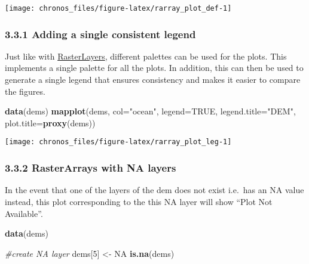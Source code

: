 \documentclass[]{article}
\newenvironment{Shaded}{\begin{snugshade}}{\end{snugshade}}
\newcommand{\KeywordTok}[1]{\textcolor[rgb]{0.13,0.29,0.53}{\textbf{#1}}}
\newcommand{\DataTypeTok}[1]{\textcolor[rgb]{0.13,0.29,0.53}{#1}}
\newcommand{\DecValTok}[1]{\textcolor[rgb]{0.00,0.00,0.81}{#1}}
\newcommand{\StringTok}[1]{\textcolor[rgb]{0.31,0.60,0.02}{#1}}
\newcommand{\CommentTok}[1]{\textcolor[rgb]{0.56,0.35,0.01}{\textit{#1}}}
\newcommand{\OtherTok}[1]{\textcolor[rgb]{0.56,0.35,0.01}{#1}}
\newcommand{\NormalTok}[1]{#1}
\begin{document}
\begin{center}\texttt{[image: chronos\_files/figure-latex/rarray\_plot\_def-1]} \end{center}

\subsubsection{3.3.1 Adding a single consistent
legend}\label{adding-a-single-consistent-legend}

Just like with \protect\hyperlink{RasterLayer}{RasterLayers}, different
palettes can be used for the plots. This implements a single palette for
all the plots. In addition, this can then be used to generate a single
legend that ensures consistency and makes it easier to compare the
figures.

\begin{Shaded}
\begin{Highlighting}[]
\KeywordTok{data}\NormalTok{(dems)}
\KeywordTok{mapplot}\NormalTok{(dems, }\DataTypeTok{col=}\StringTok{"ocean"}\NormalTok{, }\DataTypeTok{legend=}\OtherTok{TRUE}\NormalTok{, }\DataTypeTok{legend.title=}\StringTok{"DEM"}\NormalTok{, }
        \DataTypeTok{plot.title=}\KeywordTok{proxy}\NormalTok{(dems))}
\end{Highlighting}
\end{Shaded}

\begin{center}\texttt{[image: chronos\_files/figure-latex/rarray\_plot\_leg-1]} \end{center}

\subsubsection{3.3.2 RasterArrays with NA
layers}\label{rasterarrays-with-na-layers}

In the event that one of the layers of the dem does not exist i.e.~has
an NA value instead, this plot corresponding to the this NA layer will
show ``Plot Not Available''.

\begin{Shaded}
\begin{Highlighting}[]
\KeywordTok{data}\NormalTok{(dems)}

\CommentTok{#create NA layer}
\NormalTok{dems[}\DecValTok{5}\NormalTok{] <-}\StringTok{ }\OtherTok{NA}
\KeywordTok{is.na}\NormalTok{(dems)}
\end{Highlighting}
\end{Shaded}
\end{document}

